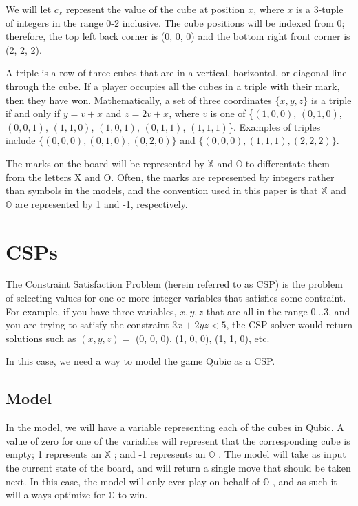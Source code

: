 \documentclass[11pt]{article}
\newcommand{\XX}{$\mathbb{X}$ }
\newcommand{\OO}{$\mathbb{O}$ }
\begin{document}
We will let $c_{x}$ represent the value of the cube at position $x$, where $x$ is a 3-tuple of integers in the range 0-2 inclusive. The cube positions will be indexed from 0; therefore, the top left back corner is (0, 0, 0) and the bottom right front corner is (2, 2, 2).

A triple is a row of three cubes that are in a vertical, horizontal, or diagonal line through the cube. If a player occupies all the cubes in a triple with their mark, then they have won. Mathematically, a set of three coordinates $\{x, y, z\}$ is a triple if and only if $y = v + x$ and $z = 2v + x$, where $v$ is one of \{$(1, 0, 0)$, $(0, 1, 0)$, $(0, 0, 1)$, $(1, 1, 0)$, $(1, 0, 1)$, $(0, 1, 1)$, $(1, 1, 1)$\}. Examples of triples include $\{(0, 0, 0), (0, 1, 0), (0, 2, 0)\}$ and $\{(0, 0, 0), (1, 1, 1), (2, 2, 2)\}$.

The marks on the board will be represented by \XX and \OO to differentate them from the letters X and O. Often, the marks are represented by integers rather than symbols in the models, and the convention used in this paper is that \XX and \OO are represented by 1 and -1, respectively.



\section{CSPs}
The Constraint Satisfaction Problem (herein referred to as CSP) is the problem of selecting values for one or more integer variables that satisfies some contraint. For example, if you have three variables, $x, y, z$ that are all in the range $0...3$, and you are trying to satisfy the constraint $3x + 2yz < 5$, the CSP solver would return solutions such as $(x,y,z) = $ (0, 0, 0), (1, 0, 0), (1, 1, 0), etc.

In this case, we need a way to model the game Qubic as a CSP.

\subsection{Model}
In the model, we will have a variable representing each of the cubes in Qubic. A value of zero for one of the variables will represent that the corresponding cube is empty; 1 represents an \XX; and -1 represents an \OO. The model will take as input the current state of the board, and will return a single move that should be taken next. In this case, the model will only ever play on behalf of \OO, and as such it will always optimize for \OO to win.
\end{document}
